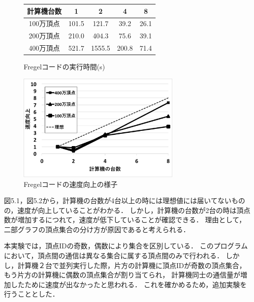 \documentclass[12pt]{ujreport}
\begin{document}
\begin{figure}[ht]
  \begin{minipage}{0.45\textwidth}
    \begin{center}
      \makeatletter
      \def\@captype{table}
      \makeatother
      \begin{tabular}{|c||c|c|c|c|}\hline
        計算機台数 & 1 & 2 & 4 & 8\\ \hline
        100万頂点 & 101.5 & 121.7 & 39.2 & 26.1\\ \hline
        200万頂点 & 210.0 & 404.3 & 75.6 & 39.1\\ \hline
        400万頂点 & 521.7 & 1555.5 & 200.8 & 71.4 \\ \hline
      \end{tabular}
      \caption{Fregelコードの実行時間(s)}
    \end{center}
  \end{minipage}
  \begin{minipage}{0.8\textwidth}
    \begin{center}
      \includegraphics[width = 8cm]{kisuuFregel.png}
      \caption{Fregelコードの速度向上の様子}
    \end{center}
  \end{minipage}
\end{figure}

\newpage
図5.1，図5.2から，計算機の台数が4台以上の時には理想値には届いてないものの，速度が向上していることがわかる．
しかし，計算機の台数が2台の時は頂点数が増加するにつれて，速度が低下していることが確認できる．
理由として，二部グラフの頂点集合の分け方が原因であると考えられる．

本実験では，頂点IDの奇数，偶数により集合を区別している．
このプログラムにおいて，頂点間の通信は異なる集合に属する頂点間のみで行われる．
しかし，計算機２台で並列実行した際，片方の計算機に頂点IDが奇数の頂点集合，もう片方の計算機に偶数の頂点集合が割り当てられ，
計算機同士の通信量が増加したために速度が出なかったと思われる．
これを確かめるため，追加実験を行うこととした．
\end{document}
